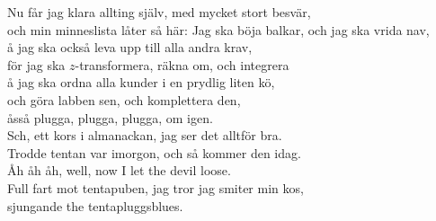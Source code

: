 \documentclass[a6paper,10pt]{article}
\begin{document}
\begin{lyrics}
Nu får jag klara allting själv, med mycket stort besvär, \\
och min minneslista låter så här:
\newpage
\setlength{\oddsidemargin}{-0.37in}
\noindent
Jag ska böja balkar, och jag ska vrida nav, \\
å jag ska också leva upp till alla andra krav, \\
för jag ska  $z$-transformera, räkna om, och integrera \\
å jag ska ordna alla kunder i en prydlig liten kö, \\
och göra labben sen, och komplettera den, \\
åsså plugga, plugga, plugga, om igen.
\vspace{5pt} \\
Sch, ett kors i almanackan, jag ser det alltför bra. \\
Trodde tentan var imorgon, och så kommer den idag. \\
Åh åh åh, well, now I let the devil loose. \\
Full fart mot tentapuben, jag tror jag smiter min kos, \\
sjungande the tentapluggsblues. 
\end{lyrics}
\end{document}
